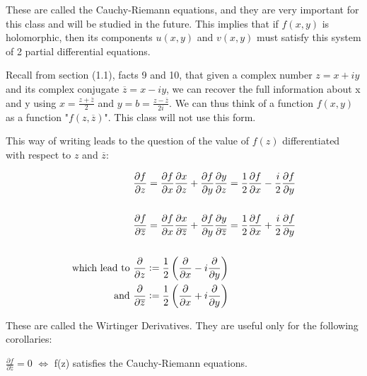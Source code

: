 These are called the Cauchy-Riemann equations, and they are very important for this class and will be studied in the future. This implies that if $f(x,y)$ is holomorphic, then its components $u(x,y)$ and $v(x,y)$ must satisfy this system of 2 partial differential equations.

\begin{remark}
Recall from section (1.1), facts 9 and 10, that given a complex number $z=x+iy$ and its complex conjugate $\overline{z} = x-iy$, we can recover the full information about x and y using $x=\frac{z+\overline{z}}{2}$ and $y=b = \frac{z-\overline{z}}{2i}$. We can thus think of a function $f(x,y)$ as a function "$f(z,\overline{z})$". This class will not use this form.
\end{remark}


This way of writing leads to the question of the value of $f(z)$ differentiated with respect to $z$ and $\overline{z}$:

\begin{align*}
    &\frac{\partial f}{\partial z} = \frac{\partial f}{\partial x}\frac{\partial  x}{\partial z} + \frac{\partial f}{\partial y}\frac{\partial y}{\partial z} = \frac{1}{2} \frac{\partial f}{\partial x} - \frac{i}{2} \frac{\partial f}{\partial y}\\\\
    &\frac{\partial f}{\partial \overline{z}} = \frac{\partial f}{\partial x}\frac{\partial  x}{\partial \overline{z}} + \frac{\partial f}{\partial y}\frac{\partial y}{\partial \overline{z}} = \frac{1}{2} \frac{\partial f}{\partial x} + \frac{i}{2} \frac{\partial f}{\partial y}\\\\
    \text{which lead to }&\frac{\partial}{\partial z} \vcentcolon= \frac{1}{2} \left( \frac{\partial}{\partial x} - i\frac{\partial}{\partial y} \right)\\
   \text{and } &\frac{\partial}{\partial \overline{z}} \vcentcolon= \frac{1}{2} \left( \frac{\partial}{\partial x} + i\frac{\partial}{\partial y} \right)
\end{align*}

These are called the Wirtinger Derivatives. They are useful only for the following corollaries:
\begin{corollary}
$\frac{\partial f}{\partial \overline{z}} = 0$ $\Leftrightarrow$ f(z) satisfies the Cauchy-Riemann equations.
\end{corollary}


